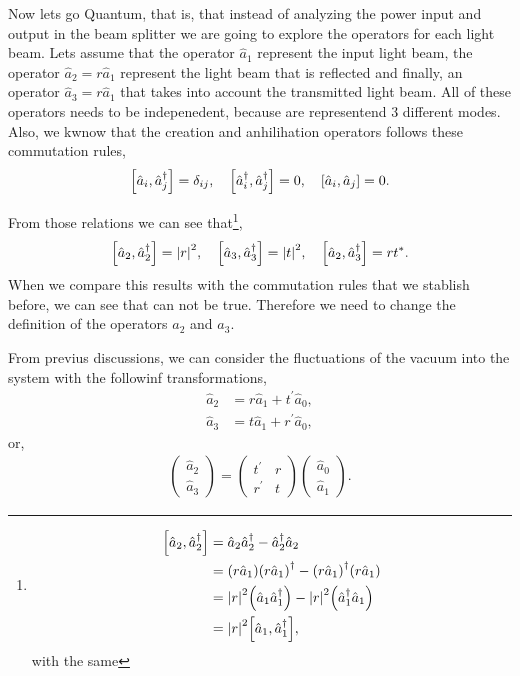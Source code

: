 \documentclass[a4paper]{tufte-handout} %
\newcommand{\hata}{\hat{a}}
\newcommand{\hatad}{\hat{a}^\dagger}
\begin{document}
Now lets go Quantum, that is, that instead of analyzing the power input and output in the beam splitter we are going to explore the operators for each light beam.
Lets assume that the operator $\hata_1$ represent the input light beam, the operator $\hata_2=r\hata_1$ represent the light beam that is reflected and finally, an operator $\hata_3=r\hata_1$ that takes into account the transmitted light beam.
All of these operators needs to be indepenedent, because are representend 3 different modes.
Also, we kwnow that the creation and anhilihation operators follows these commutation rules,
\begin{gather*}
    \commutator{\hata_i}{\hatad_j}=\delta_{ij},\quad
    \commutator{\hatad_i}{\hatad_j}=0,\quad
    \commutator{\hata_i}{\hata_j}=0.
\end{gather*}

From those relations we can see that\footnote{
\begin{align*}
    \commutator{\hata_2}{\hatad_2} &= \hata_2\hatad_2 - \hatad_2\hata_2 \\
                                   &= \qty(r\hata_1)\qty(r\hata_1)^\dagger - \qty(r\hata_1)^\dagger\qty(r\hata_1) \\
                                   &= \abs{r}^2\qty(\hata_1\hatad_1) - \abs{r}^2\qty(\hatad_1\hata_1) \\
                                    &= \abs{r}^2\commutator{\hata_1}{\hatad_1},
\end{align*}
with the same 
},
\begin{gather*}
    \commutator{\hata_2}{\hatad_2} = \abs{r}^2, \quad 
    \commutator{\hata_3}{\hatad_3} = \abs{t}^2, \quad 
    \commutator{\hata_2}{\hatad_3} = rt^*.
\end{gather*}
When we compare this results with the commutation rules that we stablish before, we can see that can not be true.
Therefore we need to change the definition of the operators $\hata_2$ and $\hata_3$.

From previus discussions, we can consider the fluctuations of the vacuum into the system with the followinf transformations,
\begin{align*}
    \hata_2 &= r\hata_1 + t^{'} \hata_0, \\
    \hata_3 &= t\hata_1 + r^{'} \hata_0,
\end{align*}
or,
\begin{gather*}
    \begin{pmatrix}
        \hata_2 \\ \hata_3
    \end{pmatrix}
    =
    \begin{pmatrix}
        t^{'} & r \\ r^{'} & t 
    \end{pmatrix}
    \begin{pmatrix}
        \hata_0 \\ \hata_1
    \end{pmatrix}.
\end{gather*}
\end{document}
